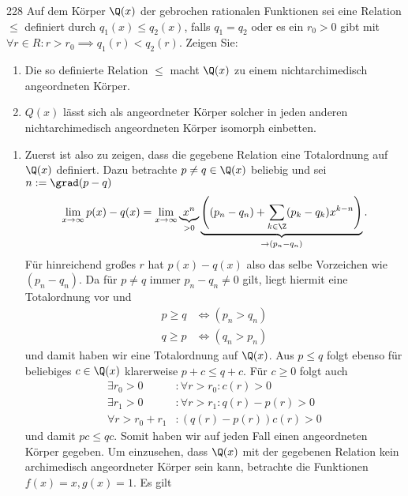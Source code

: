\begin{algebraUE}{228}
Auf dem Körper $\Q(x)$ der gebrochen rationalen Funktionen sei eine Relation $\leq$
definiert durch $q_1(x) \leq q_2(x)$, falls $q_1 = q_2$ oder es ein $r_0 > 0$ gibt
mit $\forall r \in R: r > r_0 \implies q_1(r) < q_2(r)$. Zeigen Sie:
\begin{enumerate}
  \item Die so definierte Relation $\leq$ macht $\Q(x)$ zu einem nichtarchimedisch
  angeordneten Körper.
  \item $Q(x)$ lässt sich als angeordneter Körper solcher in jeden anderen
  nichtarchimedisch angeordneten Körper isomorph einbetten.
\end{enumerate}
\end{algebraUE}
\begin{solution}
\begin{enumerate}
  \item Zuerst ist also zu zeigen, dass die gegebene Relation eine Totalordnung
  auf $\Q(x)$ definiert. Dazu betrachte $p \neq q \in \Q(x)$ beliebig und sei $n := \grad(p - q)$
  \begin{align*}
    \lim_{x \to \infty} p(x) - q(x) = \lim_{x \to \infty}\underbrace{x^n}_{> 0}
    \underbrace{\left((p_n - q_n) + \sum_{k \in \Z}(p_k - q_k)x^{k-n}\right)}_{\to (p_n - q_n)}.
  \end{align*}
  Für hinreichend großes $r$ hat $p(x) - q(x)$ also das selbe Vorzeichen wie $(p_n - q_n)$.
  Da für $p \neq q$ immer $p_n - q_n \neq 0$ gilt, liegt hiermit eine Totalordnung vor und
  \begin{align*}
    p \geq q &\iff (p_n > q_n) \\
    q \geq p &\iff (q_n > p_n)
  \end{align*}
  und damit haben wir eine Totalordnung auf $\Q(x)$.
  Aus $p \leq q$ folgt ebenso für beliebiges $c \in \Q(x)$ klarerweise $p + c \leq q + c$.
  Für $c \geq 0$ folgt auch
  \begin{align*}
    \exists r_0 > 0&: \forall r > r_0: c(r) > 0 \\
    \exists r_1 > 0&: \forall r > r_1: q(r) - p(r) > 0 \\
    \forall r > r_0 + r_1&: (q(r) - p(r))c(r) > 0
  \end{align*}
  und damit $pc \leq qc$. Somit haben wir auf jeden Fall einen angeordneten Körper
  gegeben.
  Um einzusehen, dass $\Q(x)$ mit der gegebenen Relation kein archimedisch angeordneter
  Körper sein kann, betrachte die Funktionen $f(x) = x, g(x) = 1$. Es gilt
  \begin{align*}

\end{align*}
\end{enumerate}
\end{solution}
